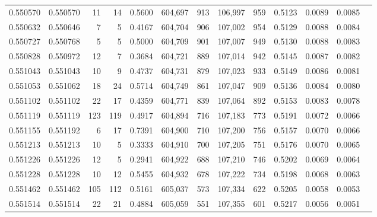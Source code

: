 \begin{tabular}{rrrrrrrrrrrrr}
0.550570 & 0.550570 &    11 &    14 &                                     0.5600 & 604,697 &     913 & 106,997 &     959 & 0.5123 & 0.0089 & 0.0085 \\
0.550632 & 0.550646 &     7 &     5 &                                     0.4167 & 604,704 &     906 & 107,002 &     954 & 0.5129 & 0.0088 & 0.0084 \\
0.550727 & 0.550768 &     5 &     5 &                                     0.5000 & 604,709 &     901 & 107,007 &     949 & 0.5130 & 0.0088 & 0.0083 \\
0.550828 & 0.550972 &    12 &     7 &                                     0.3684 & 604,721 &     889 & 107,014 &     942 & 0.5145 & 0.0087 & 0.0082 \\
0.551043 & 0.551043 &    10 &     9 &                                     0.4737 & 604,731 &     879 & 107,023 &     933 & 0.5149 & 0.0086 & 0.0081 \\
0.551053 & 0.551062 &    18 &    24 &                                     0.5714 & 604,749 &     861 & 107,047 &     909 & 0.5136 & 0.0084 & 0.0080 \\
0.551102 & 0.551102 &    22 &    17 &                                     0.4359 & 604,771 &     839 & 107,064 &     892 & 0.5153 & 0.0083 & 0.0078 \\
0.551119 & 0.551119 &   123 &   119 &                                     0.4917 & 604,894 &     716 & 107,183 &     773 & 0.5191 & 0.0072 & 0.0066 \\
0.551155 & 0.551192 &     6 &    17 &                                     0.7391 & 604,900 &     710 & 107,200 &     756 & 0.5157 & 0.0070 & 0.0066 \\
0.551213 & 0.551213 &    10 &     5 &                                     0.3333 & 604,910 &     700 & 107,205 &     751 & 0.5176 & 0.0070 & 0.0065 \\
0.551226 & 0.551226 &    12 &     5 &                                     0.2941 & 604,922 &     688 & 107,210 &     746 & 0.5202 & 0.0069 & 0.0064 \\
0.551228 & 0.551228 &    10 &    12 &                                     0.5455 & 604,932 &     678 & 107,222 &     734 & 0.5198 & 0.0068 & 0.0063 \\
0.551462 & 0.551462 &   105 &   112 &                                     0.5161 & 605,037 &     573 & 107,334 &     622 & 0.5205 & 0.0058 & 0.0053 \\
0.551514 & 0.551514 &    22 &    21 &                                     0.4884 & 605,059 &     551 & 107,355 &     601 & 0.5217 & 0.0056 & 0.0051 \\

\end{tabular}
